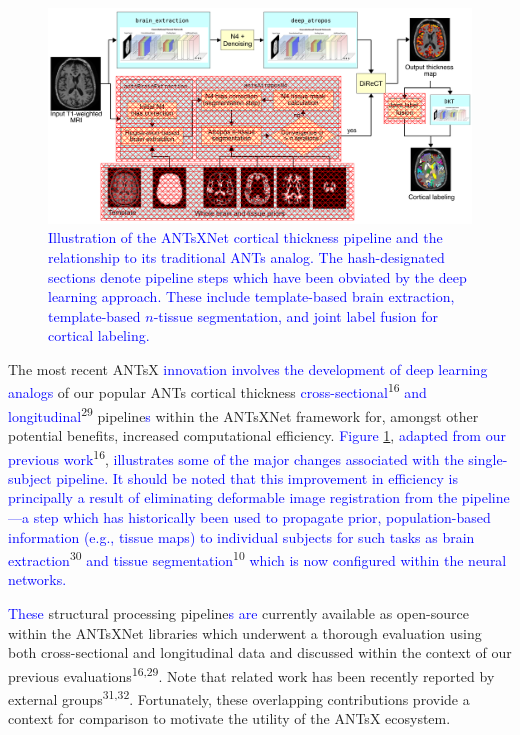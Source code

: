 \documentclass[12pt,]{article}
\begin{document}
\begin{figure}[htb]
  \centering
    \includegraphics[width=\textwidth]{Figures/antsxnetPipeline.pdf}
  \caption{\textcolor{blue}{Illustration of the ANTsXNet cortical thickness pipeline and the
  relationship to its traditional ANTs analog.  The hash-designated sections
  denote pipeline steps which have been obviated by the deep learning approach.
  These include template-based brain extraction, template-based $n$-tissue
  segmentation, and joint label fusion for cortical labeling.}}
  \label{fig:pipeline}
\end{figure}

The most recent ANTsX
\textcolor{blue}{innovation involves the development of
deep learning analogs} of our popular ANTs cortical thickness
\textcolor{blue}{cross-sectional}\textsuperscript{16}
\textcolor{blue}{and
longitudinal}\textsuperscript{29} pipeline\textcolor{blue}{s} within the
ANTsXNet framework for, amongst other potential benefits, increased
computational efficiency. \textcolor{blue}{Figure} \ref{fig:pipeline},
\textcolor{blue}{adapted from our previous work}\textsuperscript{16},
\textcolor{blue}{illustrates some of the major changes associated with the
single-subject pipeline.  It should be noted that this improvement in efficiency
is principally a result of eliminating deformable image registration from the
pipeline---a step which has historically been used to propagate prior,
population-based information (e.g., tissue maps) to individual subjects for such
tasks as brain extraction}\textsuperscript{30}
\textcolor{blue}{and tissue
segmentation}\textsuperscript{10}
\textcolor{blue}{which is now configured within
the neural networks.}

\textcolor{blue}{These} structural processing
pipeline\textcolor{blue}{s are} currently available as open-source
within the ANTsXNet libraries which underwent a thorough evaluation
using both cross-sectional and longitudinal data and discussed within
the context of our previous evaluations\textsuperscript{16,29}. Note
that related work has been recently reported by external
groups\textsuperscript{31,32}. Fortunately, these overlapping
contributions provide a context for comparison to motivate the utility
of the ANTsX ecosystem.
\end{document}
